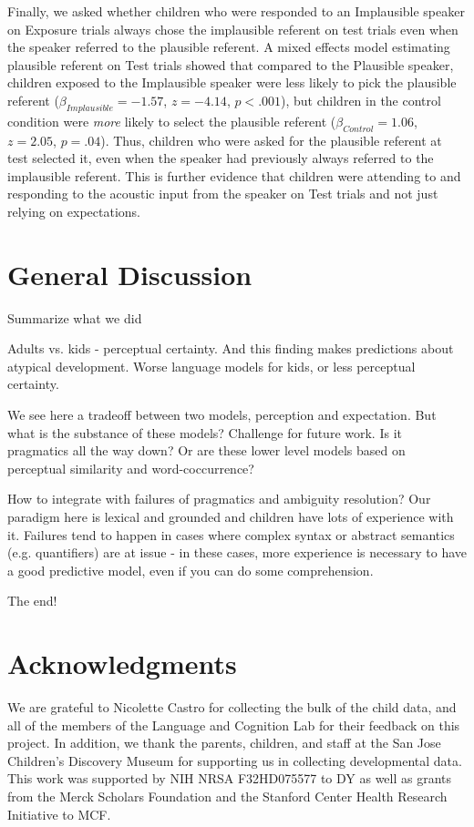 \documentclass[man,floatsintext]{apa6}
\begin{document}
Finally, we asked whether children who were responded to an Implausible speaker on Exposure trials always chose the implausible referent on test trials even when the speaker referred to the plausible referent. A mixed effects model estimating plausible referent on Test trials showed that compared to the Plausible speaker, children exposed to the Implausible speaker were less likely to pick the plausible referent ($\beta_{Implausible} = -1.57$,  $z = -4.14$, $p <.001$), but children in the control condition were \emph{more} likely to select the plausible referent ($\beta_{Control} = 1.06$,  $z = 2.05$, $p = .04$). Thus, children who were asked for the plausible referent at test selected it, even when the speaker had previously always referred to the implausible referent. This is further evidence that children were attending to and responding to the acoustic input from the speaker on Test trials and not just relying on expectations.


\section{General Discussion}

Summarize what we did

Adults vs. kids - perceptual certainty. And this finding makes predictions about atypical development. Worse language models for kids, or less perceptual certainty. 

We see here a tradeoff between two models, perception and expectation. But what is the substance of these models? Challenge for future work. Is it pragmatics all the way down? Or are these lower level models based on perceptual similarity and word-coccurrence?

How to integrate with failures of pragmatics and ambiguity resolution? Our paradigm here is lexical and grounded and children have lots of experience with it. Failures tend to happen in cases where complex syntax or abstract semantics (e.g. quantifiers) are at issue - in these cases, more experience is necessary to have a good predictive model, even if you can do some comprehension. 

The end!

\section{Acknowledgments}

We are grateful to Nicolette Castro for collecting the bulk of the child data, and all of the members of the Language and Cognition Lab for their feedback on this project. In addition, we thank the parents, children, and staff at the San Jose Children's Discovery Museum for supporting us in collecting developmental data. This work was supported by NIH NRSA F32HD075577 to DY as well as grants from the Merck Scholars Foundation and the Stanford Center Health Research Initiative to MCF.



\end{document}
